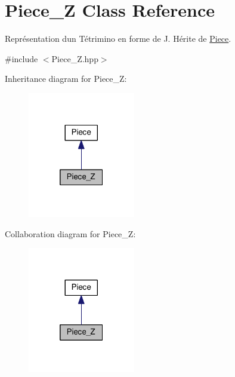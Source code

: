 \hypertarget{classPiece__Z}{}\section{Piece\+\_\+Z Class Reference}
\label{classPiece__Z}


Représentation d\textquotesingle{}un Tétrimino en forme de J. Hérite de \hyperlink{classPiece}{Piece}.  




{\ttfamily \#include $<$Piece\+\_\+\+Z.\+hpp$>$}



Inheritance diagram for Piece\+\_\+Z\+:
\nopagebreak
\begin{figure}[H]
\begin{center}
\leavevmode
\includegraphics[width=133pt]{classPiece__Z__inherit__graph}
\end{center}
\end{figure}


Collaboration diagram for Piece\+\_\+Z\+:
\nopagebreak
\begin{figure}[H]
\begin{center}
\leavevmode
\includegraphics[width=133pt]{classPiece__Z__coll__graph}
\end{center}
\end{figure}
